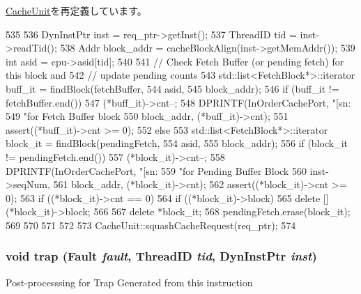 \hyperlink{classCacheUnit_ac2831520eb121be08811b040992f416b}{CacheUnit}を再定義しています。


\begin{DoxyCode}
535 {
536     DynInstPtr inst = req_ptr->getInst();
537     ThreadID tid = inst->readTid();
538     Addr block_addr = cacheBlockAlign(inst->getMemAddr());
539     int asid = cpu->asid[tid];
540 
541     // Check Fetch Buffer (or pending fetch) for this block and
542     // update pending counts
543     std::list<FetchBlock*>::iterator buff_it = findBlock(fetchBuffer,
544                                                          asid,
545                                                          block_addr);
546     if (buff_it != fetchBuffer.end()) {
547         (*buff_it)->cnt--;
548         DPRINTF(InOrderCachePort, "[sn:%
549                 "for Fetch Buffer block %
550                 block_addr, (*buff_it)->cnt);
551         assert((*buff_it)->cnt >= 0);
552     } else {
553         std::list<FetchBlock*>::iterator block_it = findBlock(pendingFetch,
554                                                               asid,
555                                                               block_addr);
556         if (block_it != pendingFetch.end()) {
557             (*block_it)->cnt--;
558             DPRINTF(InOrderCachePort, "[sn:%
559                     "for Pending Buffer Block %
560                     inst->seqNum,
561                     block_addr, (*block_it)->cnt);
562             assert((*block_it)->cnt >= 0);
563             if ((*block_it)->cnt == 0) {
564                 if ((*block_it)->block) {
565                     delete [] (*block_it)->block;
566                 }
567                 delete *block_it;
568                 pendingFetch.erase(block_it);
569             }
570         }
571     }
572 
573     CacheUnit::squashCacheRequest(req_ptr);
574 }
\end{DoxyCode}
\hypertarget{classFetchUnit_abf76d6d245f7d3b17d26ea8dcc0cf36f}{
\subsubsection[{trap}]{\setlength{\rightskip}{0pt plus 5cm}void trap ({\bf Fault} {\em fault}, \/  {\bf ThreadID} {\em tid}, \/  {\bf DynInstPtr} {\em inst})}}
\label{classFetchUnit_abf76d6d245f7d3b17d26ea8dcc0cf36f}
Post-\/processsing for Trap Generated from this instruction 

